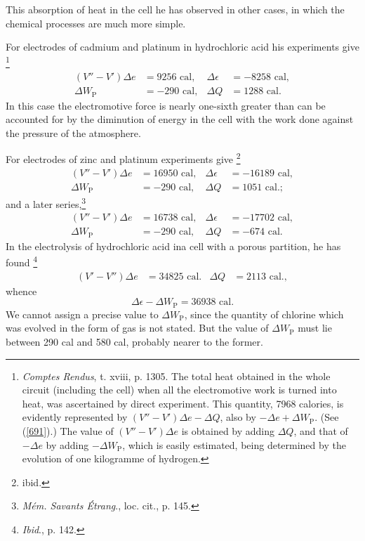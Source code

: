 \documentclass[12pt]{article}
\begin{document}
This absorption of heat in the cell he has observed in other cases, in which the chemical processes are much more simple.

For electrodes of cadmium and platinum in hydrochloric acid his
experiments give \footnote{\textit{Comptes Rendus}, t. xviii, p. 1305. The total heat obtained in the whole circuit (including the cell) when all the electromotive work is turned into heat, was ascertained by direct experiment. This quantity, 7968 calories, is evidently represented by $( V''- V') \Delta e - \Delta Q$, also by $- \Delta e + \Delta W_\text{P}$. (See (\ref{691}).) The value of $(V''  - V')\Delta e$ is obtained by adding $\Delta Q$, and that of $- \Delta e$ by adding $- \Delta W_\text{P}$, which is easily estimated, being determined by the evolution of one kilogramme of hydrogen.}
\begin{align*}(V'' - V')\Delta e &= 9256 \text{ cal},  &   \Delta \epsilon &= -8258\text{ cal},\\
\Delta W_\text{P} &= -290\text{ cal},    &   \Delta Q &= 1288\text{ cal}.\end{align*}
In this case the electromotive force is nearly one-sixth greater than can be accounted for by the diminution of energy in the cell with the work done against the pressure of the atmosphere.

For electrodes of zinc and platinum experiments give \footnote{ibid.}
\begin{align*}(V'' - V')\Delta e &= 16950 \text{ cal},  &   \Delta \epsilon &= -16189\text{ cal},\\
\Delta W_\text{P} &= -290\text{ cal},    &   \Delta Q &= 1051\text{ cal}.;\end{align*}
and a later series,\footnote{\textit{M\'{e}m. Savants \'{E}trang}., loc. cit., p. 145.}
\begin{align*}(V'' - V')\Delta e &= 16738 \text{ cal},  &   \Delta \epsilon &= -17702\text{ cal},\\
\Delta W_\text{P} &= -290\text{ cal},    &   \Delta Q &= -674\text{ cal}.\end{align*}
In the electrolysis of hydrochloric acid ina cell with a porous partition, he has found \footnote{\textit{Ibid}., p. 142.}
\begin{align*} (V' - V'') \Delta e & = 34825\text{ cal}. & \Delta Q &= 2113\text{ cal}.,\end{align*}
whence
$$\Delta \epsilon - \Delta W_\text{P} = 36938\text{ cal}.$$
We cannot assign a precise value to $\Delta W_\text{P}$, since the quantity of chlorine which was evolved in the form of gas is not stated. But the value of $\Delta W_\text{P}$ must lie between 290 cal and 580 cal, probably nearer to the former.
\end{document}
